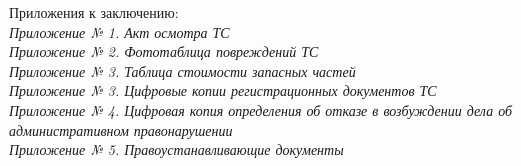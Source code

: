 Приложения к заключению:\\

\noindent \textit{\small 
	Приложение № 1. Акт осмотра ТС \\
	Приложение № 2. Фототаблица повреждений ТС \\
	Приложение № 3. Таблица стоимости запасных частей \\
	Приложение № 3. Цифровые копии регистрационных документов ТС\\
	Приложение № 4. Цифровая копия определения об отказе в возбуждении  дела об административном правонарушении\\ %
	Приложение № 5. Правоустанавливающие документы\\}

\vspace{20mm}



%
%
%